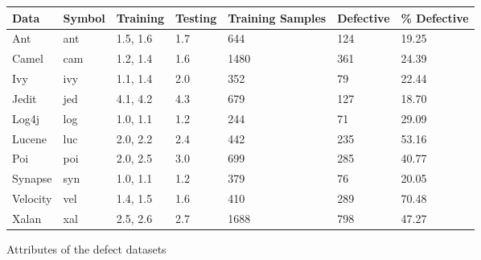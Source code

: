 \documentclass[conference]{IEEEtran}
\begin{document}
\begin{figure}[!tb]
  \renewcommand{\baselinestretch}{0.8}\begin{center}
{\scriptsize
\begin{tabular}{l@{~~~}l@{~~~}l@{~~~}l@{~~~}l@{~~~}l@{~~~}l@{~~}}
  \hline
  \rowcolor{lightgray}
  Data & Symbol & Training & Testing & Training Samples& Defective &\% Defective \\\hline

Ant & ant & 1.5, 1.6  &1.7 & 644&124&19.25\\

Camel & cam & 1.2, 1.4 & 1.6 & 1480&361 & 24.39\\

Ivy & ivy & 1.1, 1.4 & 2.0  & 352 & 79 & 22.44\\

Jedit & jed & 4.1, 4.2 & 4.3 & 679 & 127 & 18.70\\

Log4j & log & 1.0, 1.1 & 1.2 & 244 & 71 & 29.09\\

Lucene & luc & 2.0, 2.2 & 2.4 & 442 & 235 & 53.16\\

Poi & poi & 2.0, 2.5 & 3.0 & 699 & 285 & 40.77\\

Synapse & syn & 1.0, 1.1 & 1.2 & 379 & 76 & 20.05\\

Velocity & vel & 1.4, 1.5 & 1.6 & 410& 289 & 70.48\\

Xalan & xal &2.5, 2.6 &2.7 & 1688 & 798 & 47.27\\\hline
\end{tabular}}
\end{center}
\caption{Attributes of the defect datasets}\label{fig:ck}
\end{figure}
\end{document}
